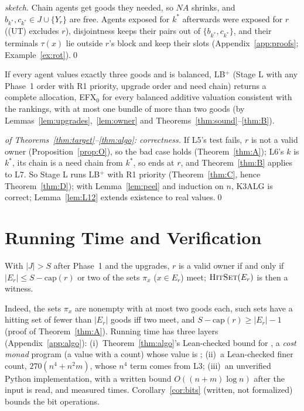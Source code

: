 \documentclass[runningheads,11pt]{llncs}
\newcommand{\efxz}{\texorpdfstring{\mbox{EFX$_0$}}{EFX0}}
\newcommand{\LBp}{\texorpdfstring{\mbox{LB$^{+}$}}{LB+}}
\newcommand{\NA}{\mathit{NA}}
\newcommand{\capa}{\mathrm{cap}}
\begin{document}
\begin{proof}[sketch]
Chain agents get goods they needed, so $\NA$ shrinks, and $b_{k^*},c_{k^*}\in J\cup\{Y_r\}$ are free. Agents exposed for $k^*$ afterwards were exposed for $r$ ((UT) excludes $r$), disjointness keeps their pairs out of $\{b_{k^*},c_{k^*}\}$, and their terminals $\tau(x)$ lie outside $r$'s block and keep their slots (Appendix~\ref{app:proofs}; Example~\ref{ex:rot}).\qed
\end{proof}

\begin{theorem}[\LBp{} never fails]\label{thm:C}
If every agent values exactly three goods and is balanced, \LBp{} (Stage L with any Phase~1 order with R1 priority, upgrade order and need chain) returns a complete allocation, \efxz{} for every balanced additive valuation consistent with the rankings, with at most one bundle of more than two goods (by Lemmas~\ref{lem:upgrades},~\ref{lem:owner} and Theorems~\ref{thm:sound}--\ref{thm:B}).
\end{theorem}

\begin{proof}[of Theorems~\ref{thm:target}--\ref{thm:algo}: correctness]
If L5's test fails, $r$ is not a valid owner (Proposition~\ref{prop:O}), so the bad case holds (Theorem~\ref{thm:A}); L6's $k$ is $k^*$, its chain is a need chain from $k^*$, so ends at $r$, and Theorem~\ref{thm:B} applies to L7. So Stage L runs \LBp{} with R1 priority (Theorem~\ref{thm:C}, hence Theorem~\ref{thm:D}); with Lemma~\ref{lem:peel} and induction on $n$, K3ALG is correct; Lemma~\ref{lem:L12} extends existence to real values.\qed
\end{proof}

\section{Running Time and Verification}\label{sec:time}

\begin{proposition}\label{prop:O}
With $|J|>S$ after Phase~1 and the upgrades, $r$ is a valid owner if and only if $|E_r|\le S-\capa(r)$ or two of the sets $\pi_x$ ($x\in E_r$) meet; $\textup{\textsc{HitSet}}(E_r)$ is then a witness.
\end{proposition}

\noindent Indeed, the sets $\pi_x$ are nonempty with at most two goods each, such sets have a hitting set of fewer than $|E_r|$ goods iff two meet, and $S-\capa(r)\ge|E_r|-1$ (proof of Theorem~\ref{thm:A}). Running time has three layers (Appendix~\ref{app:algo}): (i)~Theorem~\ref{thm:algo}'s Lean-checked bound for , a \emph{cost monad} program (a value with a count) whose value is ; (ii)~a Lean-checked finer count, $270(n^4+n^2m)$, whose $n^4$ term comes from L3; (iii)~an unverified Python implementation, with a written bound $O((n+m)\log n)$ after the input is read, and measured times. Corollary~\ref{cor:bits} (written, not formalized) bounds the bit operations.
\end{document}
